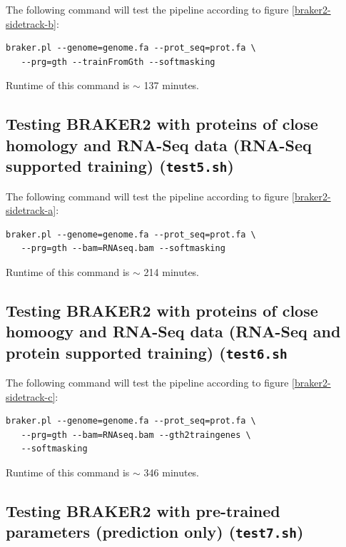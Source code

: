 \documentclass[]{article}
\begin{document}
The following command will test the pipeline according to figure
\ref{braker2-sidetrack-b}:

\begin{verbatim}
braker.pl --genome=genome.fa --prot_seq=prot.fa \
   --prg=gth --trainFromGth --softmasking
\end{verbatim}

Runtime of this command is \(\sim\) 137 minutes.

\subsection{Testing BRAKER2 with proteins of close homology and RNA-Seq data (RNA-Seq supported training) (\texttt{test5.sh})}\label{testing-braker2-with-proteins-of-close-homology-and-rna-seq-data-rna-seq-supported-training-test5.sh}

The following command will test the pipeline according to figure
\ref{braker2-sidetrack-a}:

\begin{verbatim}
braker.pl --genome=genome.fa --prot_seq=prot.fa \
   --prg=gth --bam=RNAseq.bam --softmasking
\end{verbatim}

Runtime of this command is \(\sim\) 214 minutes.

\subsection{Testing BRAKER2 with proteins of close homoogy and RNA-Seq data (RNA-Seq and protein supported training) (\texttt{test6.sh}}\label{testing-braker2-with-proteins-of-close-homoogy-and-rna-seq-data-rna-seq-and-protein-supported-training-test6.sh}

The following command will test the pipeline according to figure
\ref{braker2-sidetrack-c}:

\begin{verbatim}
braker.pl --genome=genome.fa --prot_seq=prot.fa \
   --prg=gth --bam=RNAseq.bam --gth2traingenes \
   --softmasking
\end{verbatim}

Runtime of this command is \(\sim\) 346 minutes.

\subsection{Testing BRAKER2 with pre-trained parameters (prediction only)
(\texttt{test7.sh})}\label{testing-braker2-with-pre-trained-parameters-prediction-only-test7.sh}
\end{document}

